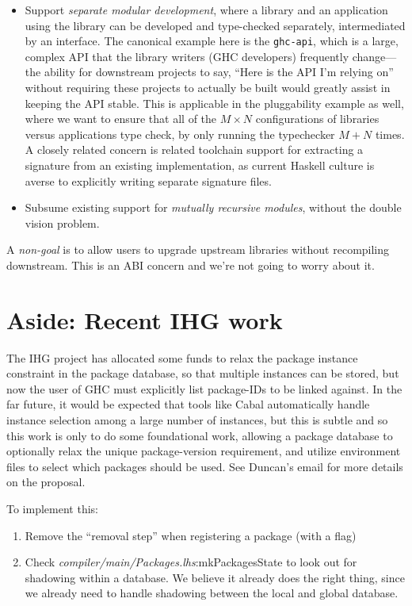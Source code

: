 \documentclass{article}
\newcommand{\ghcfile}[1]{\textsl{#1}}
\begin{document}
\begin{itemize}
    \item Support \emph{separate modular development}, where a library and
        an application using the library can be developed and type-checked
        separately, intermediated by an interface.  The canonical example
        here is the \verb|ghc-api|, which is a large, complex API that
        the library writers (GHC developers) frequently change---the ability
        for downstream projects to say, ``Here is the API I'm relying on''
        without requiring these projects to actually be built would greatly
        assist in keeping the API stable. This is applicable in
        the pluggability example as well, where we want to ensure that all
        of the $M \times N$ configurations of libraries versus applications
        type check, by only running the typechecker $M + N$ times.  A closely
        related concern is related toolchain support for extracting a signature
        from an existing implementation, as current Haskell culture is averse
        to explicitly writing separate signature files.

    \item Subsume existing support for \emph{mutually recursive modules},
        without the double vision problem.
\end{itemize}

A \emph{non-goal} is to allow users to upgrade upstream libraries
without recompiling downstream. This is an ABI concern and we're not
going to worry about it.

\section{Aside: Recent IHG work}\label{sec:ihg}

The IHG project has allocated some funds to relax the package instance
constraint in the package database, so that multiple instances can be
stored, but now the user of GHC must explicitly list package-IDs to be
linked against.  In the far future, it would be expected that tools like
Cabal automatically handle instance selection among a large number of
instances, but this is subtle and so this work is only to do some
foundational work, allowing a package database to optionally relax the
unique package-version requirement, and utilize environment files to
select which packages should be used.  See Duncan's email for more
details on the proposal.

To implement this:

\begin{enumerate}

    \item Remove the ``removal step'' when registering a package (with a flag)

    \item Check \ghcfile{compiler/main/Packages.lhs}:mkPackagesState to look out for shadowing
      within a database. We believe it already does the right thing, since
      we already need to handle shadowing between the local and global database.

\end{enumerate}
\end{document}
